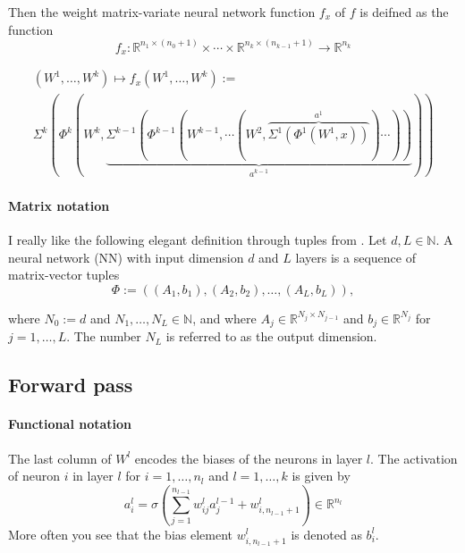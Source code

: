 \documentclass{article}
\def\RealSet{\mathbb{R}}
\begin{document}
Then the weight matrix-variate neural network function $f_x$ of $f$ is deifned as the function
\[
f_x \colon \RealSet^{n_1 \times (n_0 + 1)} \times \cdots \times \RealSet^{n_k \times (n_{k-1} + 1)} \rightarrow \RealSet^{n_k}
\]

\begin{multline}\label{f_x}
(W^1,\dots,W^k)\mapsto f_x(W^1,\dots,W^k) := \\
\Sigma^k( \Phi^k( W^k, \underbrace{\Sigma^{k-1}( \Phi^{k-1}( W^{k-1}, \cdots (W^2, \overbrace{\Sigma^1( \Phi^1(W^1, x))}^{a^1}) \cdots) ) }_{a^{k-1}} ))
\end{multline}

\paragraph{Matrix notation}
I really like the following elegant definition through tuples from \cite{Karner:2022}. Let $d, L \in \mathbb{N}$. A neural network (NN) with input dimension $d$ and $L$ layers is
a sequence of matrix-vector tuples
\[
\Phi := ((A_1, b_1), (A_2, b_2), \ldots , (A_L, b_L)),
\]

where $N_0 := d$ and $N_1, \ldots , N_L \in \mathbb{N}$, and where $A_j \in \RealSet^{N_{j}\times N_{j-1}}$ and $b_j \in \RealSet^{N_j}$ for $j = 1, \ldots, L$. The number $N_L$ is referred to as the output dimension.


\subsection{Forward pass}

\paragraph{Functional notation}
The last column of $W^l$ encodes the biases of the neurons in layer $l$. The activation of neuron $i$ in layer $l$ for $i = 1,\dots,n_l$ and $l = 1,\dots,k$ is given by
\begin{equation}\label{forward_f}
a^l_i = \sigma \left( \sum_{j=1}^{n_{l-1}} w_{ij}^l a_j^{l-1} + w_{i,n_{l-1}+1}^l \right) \in \RealSet^{n_l}
\end{equation}
More often you see that the bias element $w^l_{i,n_{l-1}+1}$ is denoted as $b_i^l$.
\end{document}
